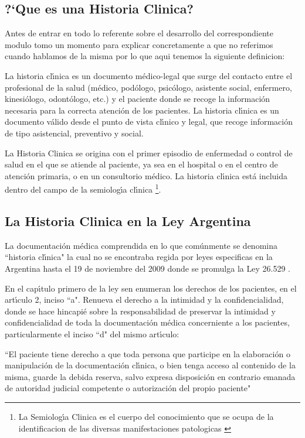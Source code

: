 \begin{Itemize}
\subsection{?`Que es una Historia Clinica?}

Antes de entrar en todo lo referente sobre el desarrollo del correspondiente modulo
tomo un momento para explicar concretamente a que no referimos cuando hablamos de 
la misma por lo que aqui tenemos la siguiente definicion:

La historia cl\'{\i}nica es un documento m\'edico-legal que surge del contacto entre el 
profesional de la salud (m\'edico, pod\'ologo, psic\'ologo, asistente social, enfermero, 
kinesi\'ologo, odont\'ologo, etc.) y el paciente donde se recoge la informaci\'on necesaria 
para la correcta atenci\'on de los pacientes. La historia cl\'{\i}nica es un documento 
v\'alido desde el punto de vista cl\'{\i}nico y legal, que recoge informaci\'on de tipo 
asistencial, preventivo y social.

La Historia Clinica se origina con el primer episodio de enfermedad o control de salud en 
el que se atiende al paciente, ya sea en el hospital o en el centro de atenci\'on primaria, 
o en un consultorio m\'edico. La historia cl\'{\i}nica est\'a incluida dentro del campo de la 
semiolog\'{\i}a cl\'{\i}nica \footnote{La Semiolog\'{\i}a Clinica es el cuerpo del conocimiento
que se ocupa de la identificacion de las diversas manifestaciones patologicas 
\cite{SemiClin}}.

\subsection{La Historia Clinica en la Ley Argentina}

La documentaci\'on m\'edica comprendida en lo que com\'unmente se denomina ``historia 
cl\'{\i}nica" la cual no se encontraba regida por leyes especificas en la Argentina hasta
el 19 de noviembre del 2009 donde se promulga la Ley 26.529 \cite{LeyHC}.

En el cap\'{\i}tulo primero de la ley sen enumeran los derechos de los pacientes, 
en el art\'{\i}culo 2, inciso ``a". Renueva el derecho a la intimidad y la confidencialidad, 
donde se hace hincapi\'e sobre la responsabilidad de preservar la intimidad y 
confidencialidad de toda la documentaci\'on m\'edica concerniente a los pacientes, 
particularmente el inciso ``d" del mismo art\'{\i}culo:

``El paciente tiene derecho a que toda persona que participe en la elaboraci\'on 
o manipulaci\'on de la documentaci\'on cl\'{\i}nica, o bien tenga acceso al contenido de 
la misma, guarde la debida reserva, salvo expresa disposici\'on en contrario 
emanada de autoridad judicial competente o autorizaci\'on del propio paciente"


\end{Itemize}

